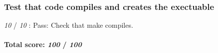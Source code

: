 \subsubsection*{Test that code compiles and creates the exectuable}


\begin{DoxyItemize}
\item {\itshape 10} / {\itshape 10} \+: Pass\+: Check that make compiles.
\end{DoxyItemize}

\paragraph*{Total score\+: {\itshape 100} / {\itshape 100}}